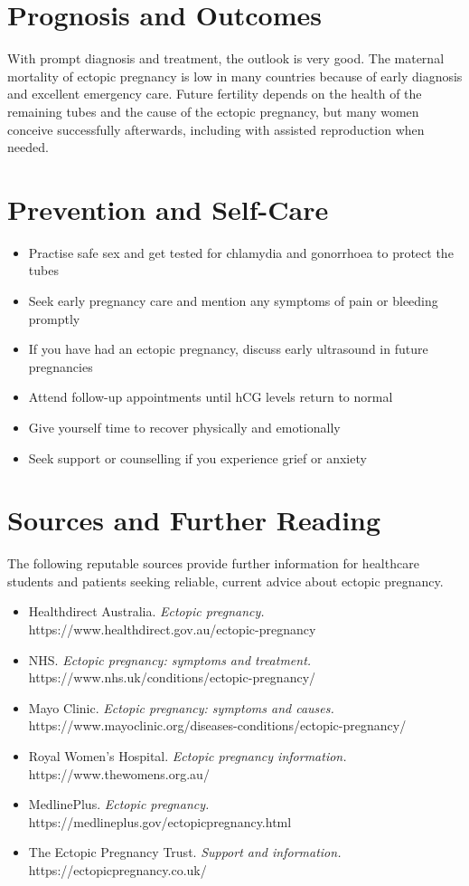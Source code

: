 \section*{Prognosis and Outcomes}
With prompt diagnosis and treatment, the outlook is very good. The maternal mortality of ectopic pregnancy is low in many countries because of early diagnosis and excellent emergency care. Future fertility depends on the health of the remaining tubes and the cause of the ectopic pregnancy, but many women conceive successfully afterwards, including with assisted reproduction when needed.

\section*{Prevention and Self-Care}
\begin{itemize}
    \item Practise safe sex and get tested for chlamydia and gonorrhoea to protect the tubes
    \item Seek early pregnancy care and mention any symptoms of pain or bleeding promptly
    \item If you have had an ectopic pregnancy, discuss early ultrasound in future pregnancies
    \item Attend follow-up appointments until hCG levels return to normal
    \item Give yourself time to recover physically and emotionally
    \item Seek support or counselling if you experience grief or anxiety
\end{itemize}

\section*{Sources and Further Reading}
The following reputable sources provide further information for healthcare students and patients seeking reliable, current advice about ectopic pregnancy.
\begin{itemize}
    \item Healthdirect Australia. \textit{Ectopic pregnancy.} https://www.healthdirect.gov.au/ectopic-pregnancy
    \item NHS. \textit{Ectopic pregnancy: symptoms and treatment.} https://www.nhs.uk/conditions/ectopic-pregnancy/
    \item Mayo Clinic. \textit{Ectopic pregnancy: symptoms and causes.} https://www.mayoclinic.org/diseases-conditions/ectopic-pregnancy/
    \item Royal Women's Hospital. \textit{Ectopic pregnancy information.} https://www.thewomens.org.au/
    \item MedlinePlus. \textit{Ectopic pregnancy.} https://medlineplus.gov/ectopicpregnancy.html
    \item The Ectopic Pregnancy Trust. \textit{Support and information.} https://ectopicpregnancy.co.uk/
\end{itemize}
